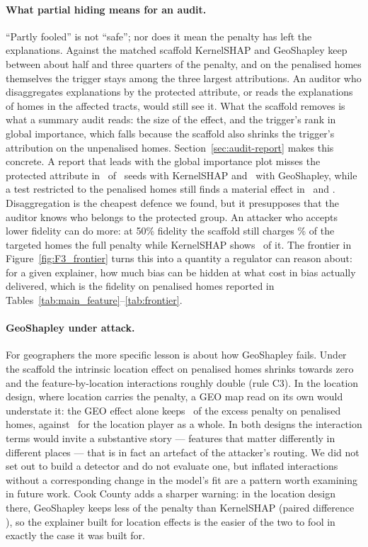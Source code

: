 \paragraph{What partial hiding means for an audit.} ``Partly fooled'' is not ``safe''; nor does it mean the
penalty has left the explanations. Against the matched scaffold KernelSHAP and GeoShapley keep between about half and three quarters of the
penalty, and on the penalised homes themselves the trigger stays among the three largest attributions. An auditor who
disaggregates explanations by the protected attribute, or reads the explanations of homes in the affected tracts,
would still see it. What the scaffold removes is what a summary audit reads: the size of the effect, and the trigger's
rank in global importance, which falls because the scaffold also shrinks the trigger's attribution on the unpenalised
homes. Section~\ref{sec:audit-report} makes this concrete. A report that leads with the global importance plot misses
the protected attribute in \AuditKernelSHAPMatPassN\ of \AuditKernelSHAPMatSeeds\ seeds with KernelSHAP and
\AuditGeoShapleyMatPassN\ with GeoShapley, while a test restricted to the penalised homes still finds a material
effect in \AuditKernelSHAPMatMaterialN\ and \AuditGeoShapleyMatMaterialN. Disaggregation is the cheapest defence we
found, but it presupposes that the auditor knows who belongs to the protected group. An attacker who accepts lower fidelity can do more: at 50\% fidelity the scaffold still charges
\FKernelSHAPMatFiftyFidPen\% of the targeted homes the full penalty while KernelSHAP shows \FKernelSHAPMatFiftyKept\
of it. The frontier in Figure~\ref{fig:F3_frontier} turns this into a quantity a regulator can reason about: for a
given explainer, how much bias can be hidden at what cost in bias actually delivered, which is the fidelity on
penalised homes reported in Tables~\ref{tab:main_feature}--\ref{tab:frontier}.

\paragraph{GeoShapley under attack.} For geographers the more specific lesson is about how GeoShapley fails. Under
the scaffold the intrinsic location effect on penalised homes shrinks towards zero and the feature-by-location
interactions roughly double (rule C3). In the location design, where location carries the penalty, a GEO map read
on its own would understate it: the GEO effect alone keeps \LGeoGeoNetKept\ of the excess penalty on penalised homes,
against \LGeoShapleyMatKept\ for the location player as a whole. In both designs the interaction terms would invite
a substantive story --- features that matter differently in different places --- that is in fact an artefact of the
attacker's routing. We did not set out to build a detector and do not evaluate one, but inflated
interactions without a corresponding change in the model's fit are a pattern worth examining in future work. Cook
County adds a sharper warning: in the location design there, GeoShapley keeps less of the penalty than KernelSHAP
(paired difference \CookLGeoMinusKsKept), so the explainer built for location effects is the easier of the two to fool
in exactly the case it was built for.

